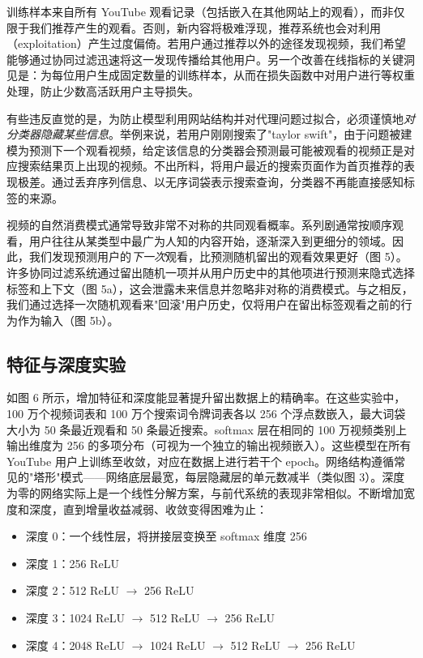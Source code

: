 训练样本来自所有 YouTube 观看记录（包括嵌入在其他网站上的观看），而非仅限于我们推荐产生的观看。否则，新内容将极难浮现，推荐系统也会对利用（exploitation）产生过度偏倚。若用户通过推荐以外的途径发现视频，我们希望能够通过协同过滤迅速将这一发现传播给其他用户。另一个改善在线指标的关键洞见是：为每位用户生成固定数量的训练样本，从而在损失函数中对用户进行等权重处理，防止少数高活跃用户主导损失。

有些违反直觉的是，为防止模型利用网站结构并对代理问题过拟合，必须谨慎地\textit{对分类器隐藏某些信息}。举例来说，若用户刚刚搜索了"taylor swift"，由于问题被建模为预测下一个观看视频，给定该信息的分类器会预测最可能被观看的视频正是对应搜索结果页上出现的视频。不出所料，将用户最近的搜索页面作为首页推荐的表现极差。通过丢弃序列信息、以无序词袋表示搜索查询，分类器不再能直接感知标签的来源。

视频的自然消费模式通常导致非常不对称的共同观看概率。系列剧通常按顺序观看，用户往往从某类型中最广为人知的内容开始，逐渐深入到更细分的领域。因此，我们发现预测用户的\textit{下一次}观看，比预测随机留出的观看效果更好（图 5）。许多协同过滤系统通过留出随机一项并从用户历史中的其他项进行预测来隐式选择标签和上下文（图 5a），这会泄露未来信息并忽略非对称的消费模式。与之相反，我们通过选择一次随机观看来"回滚"用户历史，仅将用户在留出标签观看之前的行为作为输入（图 5b）。

\subsection{特征与深度实验}

如图 6 所示，增加特征和深度能显著提升留出数据上的精确率。在这些实验中，100 万个视频词表和 100 万个搜索词令牌词表各以 256 个浮点数嵌入，最大词袋大小为 50 条最近观看和 50 条最近搜索。softmax 层在相同的 100 万视频类别上输出维度为 256 的多项分布（可视为一个独立的输出视频嵌入）。这些模型在所有 YouTube 用户上训练至收敛，对应在数据上进行若干个 epoch。网络结构遵循常见的"塔形"模式——网络底层最宽，每层隐藏层的单元数减半（类似图 3）。深度为零的网络实际上是一个线性分解方案，与前代系统的表现非常相似。不断增加宽度和深度，直到增量收益减弱、收敛变得困难为止：

\begin{itemize}
  \item 深度 0：一个线性层，将拼接层变换至 softmax 维度 256
  \item 深度 1：256 ReLU
  \item 深度 2：512 ReLU $\rightarrow$ 256 ReLU
  \item 深度 3：1024 ReLU $\rightarrow$ 512 ReLU $\rightarrow$ 256 ReLU
  \item 深度 4：2048 ReLU $\rightarrow$ 1024 ReLU $\rightarrow$ 512 ReLU $\rightarrow$ 256 ReLU
\end{itemize}

